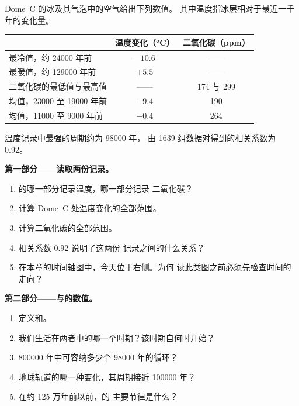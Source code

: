 \begin{problem}
\label{pb:g12:past-climates:1}
Dome~C 的冰及其气泡中的空气给出下列数值。
其中温度指冰层相对于最近一千年的变化量。

\begin{center}
\small
\begin{tabular}{|l|c|c|}
\hline
 & \textbf{温度变化（\unit{\degreeCelsius}）} & \textbf{二氧化碳（ppm）} \\
\hline
最冷值，约 \num{24000} 年前 & $-10.6$ &——\\
最暖值，约 \num{129000} 年前 & $+5.5$ &——\\
二氧化碳的最低值与最高值 &——& 174 与 299 \\
均值，\num{23000} 至 \num{19000} 年前 & $-9.4$ & 190 \\
均值，\num{11000} 至 \num{9000} 年前 & $-0.4$ & 264 \\
\hline
\end{tabular}
\end{center}

温度记录中最强的周期约为 \num{98000} 年，
由 1639 组数据对得到的相关系数为 0.92。

\medskip
\noindent\textbf{第一部分——读取两份记录。}
\begin{enumerate}
  \item {}的哪一部分记录温度，哪一部分记录
        二氧化碳？
  \item 计算 Dome~C 处温度变化的全部范围。
  \item 计算二氧化碳的全部范围。
  \item 相关系数 0.92 说明了这两份
        记录之间的什么关系？
  \item 在本章的时间轴图中，今天位于右侧。为何
        读此类图之前必须先检查时间的走向？
\end{enumerate}

\medskip
\noindent\textbf{第二部分——与的数值。}
\begin{enumerate}[resume]
  \item 定义和。
  \item 我们生活在两者中的哪一个时期？该时期自何时开始？
  \item \num{800000} 年中可容纳多少个 \num{98000} 年的循环？
  \item 地球轨道的哪一种变化，其周期接近
        \num{100000} 年？
  \item 在约 125 万年前以前，的
        主要节律是什么？
\end{enumerate}


\end{problem}
